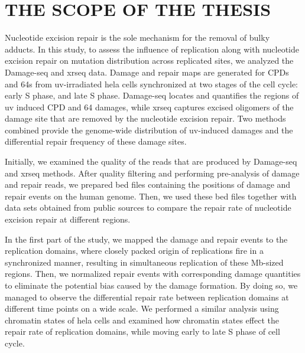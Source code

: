 \setlength{\parindent}{0pt}
\chapter{\bf THE SCOPE OF THE THESIS}

Nucleotide excision repair is the sole mechanism for the removal of bulky adducts. In this study, to assess the influence of replication along with nucleotide excision repair on mutation distribution across replicated sites, we analyzed the Damage-seq and \gls{xrseq} data. Damage and repair maps are generated for \gls{CPD}s and \gls{64}s from \gls{uv}-irradiated \gls{hela} cells synchronized at two stages of the cell cycle: early S phase, and late S phase. Damage-seq locates and quantifies the regions of \gls{uv} induced \gls{CPD} and \gls{64} damages, while \gls{xrseq} captures excised oligomers of the damage site that are removed by the nucleotide excision repair. Two methods combined provide the genome-wide distribution of \gls{uv}-induced damages and the differential repair frequency of these damage sites. 

Initially, we examined the quality of the reads that are produced by Damage-seq and \gls{xrseq} methods. After quality filtering and performing pre-analysis of damage and repair reads, we prepared bed files containing the positions of damage and repair events on the human genome. Then, we used these bed files together with data sets obtained from public sources to compare the repair rate of nucleotide excision repair at different regions.

In the first part of the study, we mapped the damage and repair events to the replication domains, where closely packed origin of replications fire in a synchronized manner, resulting in simultaneous replication of these Mb-sized regions. Then, we normalized repair events with corresponding damage quantities to eliminate the potential bias caused by the damage formation. By doing so, we managed to observe the differential repair rate between replication domains at different time points on a wide scale. We performed a similar analysis using chromatin states of \gls{hela} cells and examined how chromatin states effect the repair rate of replication domains, while moving early to late S phase of cell cycle.

